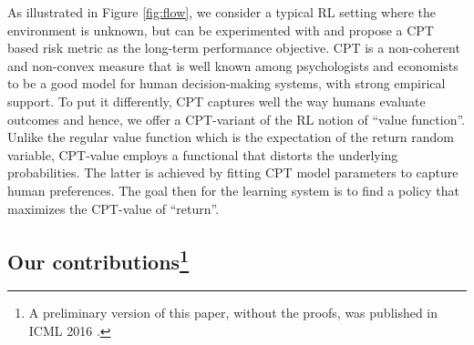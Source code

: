 As illustrated in Figure \ref{fig:flow}, we consider a typical RL setting where the environment is unknown, but can be experimented with and propose a CPT based risk metric as the long-term performance objective.  
CPT is a non-coherent and non-convex measure 
that is well known among psychologists and economists to be a good model for human decision-making systems, with strong empirical support.
To put it differently, CPT captures well the way humans evaluate outcomes and hence, we offer a CPT-variant of the RL notion of ``value function''. Unlike the regular value function which is the expectation of the return random variable, CPT-value employs a functional that distorts the underlying probabilities. The latter is achieved by fitting CPT model parameters to capture human preferences. The goal then for the learning system is to find a policy that maximizes the CPT-value of ``return''. 
\fi
%
%

\subsection*{Our contributions\footnote{A preliminary version of this paper, without the proofs, was published in ICML 2016 \cite{la2016cumulative}.}}

